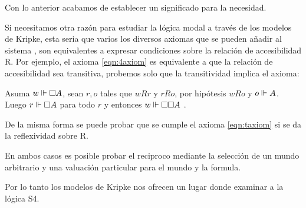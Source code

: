 Con lo anterior acabamos de establecer un significado para la necesidad.

Si necesitamos otra razón para estudiar la lógica modal a través de los modelos de Kripke, esta seria que varios los diversos axiomas que se pueden añadir al sistema \K, son equivalentes a expresar condiciones sobre la relación de accesibilidad R.  Por ejemplo, el axioma \eqref{eqn:4axiom} es equivalente a que la relación de accesibilidad sea transitiva, probemos solo que la transitividad implica el axioma:

Asuma $ w \Vdash \square A $, sean $r, o$ tales que $wRr$ y $rRo$, por hipótesis $wRo$ y $o \Vdash A$. Luego $ r \Vdash \square A$ para todo $r$ y entonces $w \Vdash \square \square A$ .


De la misma forma se puede probar que se cumple el axioma \eqref{eqn:taxiom} si se da la reflexividad sobre R.

En ambos casos es posible probar el reciproco mediante la selección de un mundo arbitrario y una valuación particular para el mundo y la formula.


Por lo tanto los modelos de Kripke nos ofrecen un lugar donde examinar a la lógica S4.
